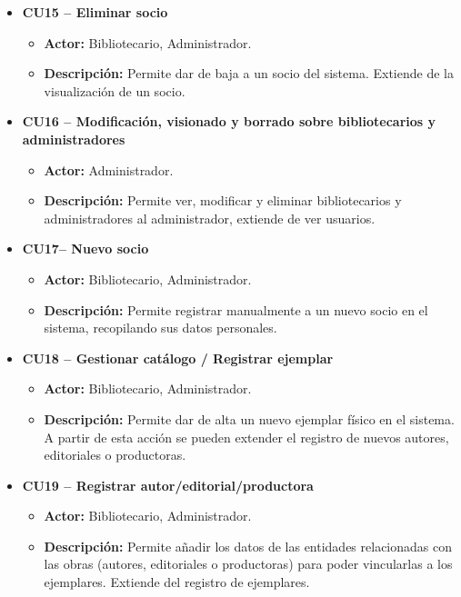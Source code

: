 \begin{itemize}
	\item \textbf{CU15 -- Eliminar socio}
	\begin{itemize}
		\item \textbf{Actor:} Bibliotecario, Administrador.
		\item \textbf{Descripción:} Permite dar de baja a un socio del sistema. Extiende de la visualización de un socio.
	\end{itemize}
		
	\item \textbf{CU16 -- Modificación, visionado y borrado sobre bibliotecarios y administradores}
	\begin{itemize}
		\item \textbf{Actor:} Administrador.
		\item \textbf{Descripción:} Permite ver, modificar y eliminar bibliotecarios y administradores al administrador, extiende de ver usuarios.
	\end{itemize}
	
	\item \textbf{CU17-- Nuevo socio}
	\begin{itemize}
		\item \textbf{Actor:} Bibliotecario, Administrador.
		\item \textbf{Descripción:} Permite registrar manualmente a un nuevo socio en el sistema, recopilando sus datos personales.
	\end{itemize}
	
	\item \textbf{CU18 -- Gestionar catálogo / Registrar ejemplar}
	\begin{itemize}
		\item \textbf{Actor:} Bibliotecario, Administrador.
		\item \textbf{Descripción:} Permite dar de alta un nuevo ejemplar físico en el sistema. A partir de esta acción se pueden extender el registro de nuevos autores, editoriales o productoras.
	\end{itemize}
	
	\item \textbf{CU19 -- Registrar autor/editorial/productora}
	\begin{itemize}
		\item \textbf{Actor:} Bibliotecario, Administrador.
		\item \textbf{Descripción:} Permite añadir los datos de las entidades relacionadas con las obras (autores, editoriales o productoras) para poder vincularlas a los ejemplares. Extiende del registro de ejemplares.
	\end{itemize}
	

\end{itemize}

